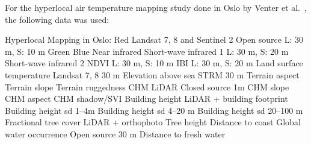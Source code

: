 For the hyperlocal air temperature mapping study done in Oslo by Venter et al.~\cite{venter2020hyperlocal}, the following data was used:

Hyperlocal Mapping in Oslo:
Red Landsat 7, 8 and Sentinel 2 Open source L: 30 m, S: 10 m Green Blue Near infrared Short-wave infrared 1 L: 30 m, S: 20 m Short-wave infrared 2 NDVI L: 30 m, S: 10 m IBI L: 30 m, S: 20 m Land surface temperature Landsat 7, 8 30 m Elevation above sea STRM 30 m Terrain aspect Terrain slope Terrain ruggedness CHM LiDAR Closed source 1m CHM slope CHM aspect CHM shadow/SVI Building height LiDAR + building footprint Building height sd 1–4m Building height sd 4–20 m Building height sd 20–100 m Fractional tree cover LiDAR + orthophoto Tree height Distance to coast Global water occurrence Open source 30 m Distance to fresh water\\



